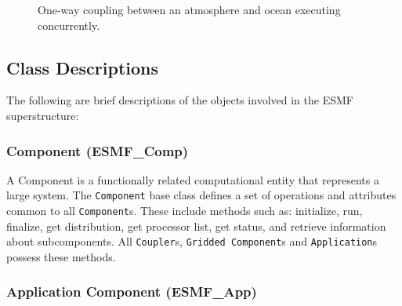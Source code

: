 \begin{figure}
\caption[{Coupling Sequence}]{One-way coupling between an atmosphere and
ocean executing concurrently.}
\label{fig:1waycoupling}
\end{figure}

\subsection{Class Descriptions}

The following are brief descriptions of the objects involved in the
ESMF superstructure:

\subsubsection{Component (ESMF\_Comp)} 
A Component is a functionally related computational entity that 
represents a large system.  The {\tt Component} base class defines a set of operations and
attributes common to all {\tt Component}s.  These include methods such as:
initialize, run, finalize, get distribution, get processor list, get status, 
and retrieve information about subcomponents.  
All {\tt Coupler}s, {\tt Gridded Component}s and {\tt Application}s possess 
these methods. 

\subsubsection{Application Component (ESMF\_App)}


